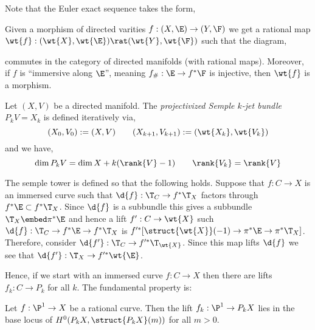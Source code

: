 \documentclass[12pt]{article}
\newcommand{\cO}{\mathcal{O}}
\begin{document}
\begin{rmk}
Note that the Euler exact sequence takes the form,
\begin{center}
\end{center}
\end{rmk}

\begin{prop}
Given a morphism of directed varities $f : (X, \E) \to (Y, \F)$ we get a rational map $\wt{f} : (\wt{X}, \wt{\E}) \rat (\wt{Y}, \wt{\F})$ such that the diagram,
\begin{center}
\end{center} 
commutes in the category of directed manifolds (with rational maps). Moreover, if $f$ is ``immersive along $\E$'', meaning $f_{\#} : \E \to f^* \F$ is injective, then $\wt{f}$ is a morphism.
\end{prop}

\begin{defn}
Let $(X, V)$ be a directed manifold. The \textit{projectivized Semple $k$-jet bundle} $P_k V = X_k$ is defined iteratively via,
\[ (X_0, V_0) := (X, V) \quad \quad (X_{k+1}, V_{k+1}) := (\wt{X_k}, \wt{V_k}) \]
and we have,
\[ \dim{P_k V} = \dim{X} + k (\rank{V} - 1) \quad \quad \rank{V_k} = \rank{V} \]
\end{defn}


The semple tower is defined so that the following holds. Suppose that $f : C \to X$ is an immersed curve such that $\d{f} : \T_C \to f^* \T_X$ factors through $f^* \E \subset f^* \T_X$. Since $\d{f}$ is a subbundle this gives a subbundle $\T_X \embed \pi^* \E$ and hence a lift $f' : C \to \wt{X}$ such $\d{f} : \T_C \to f^* \E \to f^* \T_X$ is $f'^* [\struct{\wt{X}}(-1) \to \pi^* \E \to \pi^* \T_X]$. Therefore, consider $\d{f'} : \T_C \to f'^* \T_{\wt{X}}$. Since this map lifts $\d{f}$ we see that $\d{f'} : \T_X \to f'^* \wt{\E}$.

Hence, if we start with an immersed curve $f : C \to X$ then there are lifts $f_k : C \to P_k$ for all $k$. The fundamental property is:

\begin{prop}
Let $f : \P^1 \to X$ be a rational curve. Then the lift $f_k : \P^1 \to P_k X$ lies in the base locus of $H^0(P_k X, \struct{P_k X}(m))$ for all $m > 0$.
\end{prop}
\end{document}

